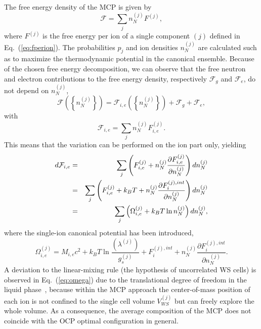 The free energy density of the MCP is given by
%
\begin{equation}
  \mathcal{F} = \sum_j n_N^{(j)} F^{(j)},
\end{equation}
%
where $F^{(j)}$ is the free energy per ion of a single component $(j)$ defined 
in Eq.~(\ref{eq:fperion}).
The probabilities $p_j$ and ion densities $n_N^{(j)}$ are calculated such as to
maximize the thermodynamic potential in the canonical ensemble. 
Because of the chosen free energy decomposition, we can observe that the 
free neutron and electron contributions to the free energy density, 
respectively $\mathcal{F}_g$ and $\mathcal{F}_e$, do not depend on $n_N^{(j)}$,
%
\begin{equation}
  \mathcal{F}\left(\left\{n_N^{(j)}\right\}\right) 
  = \mathcal{F}_{i,e}\left(\left\{n_N^{(j)}\right\}\right) 
  + \mathcal{F}_g + \mathcal{F}_e,
\end{equation}
%
with
%
\begin{equation}
  \mathcal{F}_{i,e} = \sum_j n_N^{(j)} F_{i,e}^{(j)}.
\end{equation}
%
This means that the variation can be performed on the ion part only, yielding
%
\begin{eqnarray}
  d\mathcal{F}_{i,e} &=& \sum_j \left(F_{i,e}^{(j)} + n_N^{(j)} \frac{\partial
  F_{i,e}^{(j)}}{\partial n_N^{(j)}}\right)dn_N^{(j)} \notag\\
                     &=& \sum_j \left(F_{i,e}^{(j)} + k_B T + n_N^{(j)}
                     \frac{\partial F_i^{(j),int}}{\partial
                   n_N^{(j)}}\right)dn_N^{(j)} \notag\\
  &=& \sum_j \left(\Omega_{i,e}^{(j)} + k_B T \ln
  n_N^{(j)}\right)dn_N^{(j)},\label{eq:dfi}
\end{eqnarray}
%
where the single-ion canonical potential has been introduced,
%
\begin{equation}
  \Omega_{i,e}^{(j)} = M_{i,e}c^2 + k_B T\ln\frac{(\lambda^{(j)})}{g_s^{(j)}} 
  + F_i^{(j),int} 
  + n_N^{(j)} \frac{\partial F_i^{(j),int}}{\partial n_N^{(j)}}.
  \label{eq:omega}
\end{equation}
%
A deviation to the linear-mixing rule (the hypothesis of uncorrelated WS 
cells) is observed in Eq.~(\ref{eq:omega}) due to the translational degree of 
freedom in the liquid phase~\cite{Gulminelli2015}, because within the MCP 
approach the center-of-mass position of each ion is not confined to the single 
cell volume $V_{WS}^{(j)}$ but can freely explore the whole volume. As a 
consequence, the average composition of the MCP does not coincide with the OCP 
optimal configuration in general.

